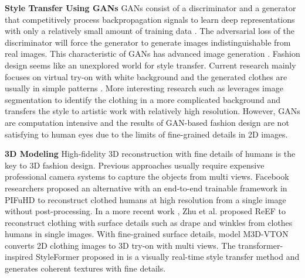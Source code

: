 \documentclass{article}
\begin{document}
\textbf{Style Transfer Using GANs} GANs consist of a discriminator and a generator that competitively process backpropagation signals to learn deep representations with only a relatively small amount of training data \cite{creswell2018GANoverview, goodfellow2014GAN}. The adversarial loss of the discriminator will force the generator to generate images indistinguishable from real images. This characteristic of GANs has advanced image generation \cite{denton2015deepGAN, radford2015unsupervisedGAN}. Fashion design seems like an unexplored world for style transfer. Current research mainly focuses on virtual try-on with white background and the generated clothes are usually in simple patterns \cite{liu2021fashionVisTool, kato2019ganClothing, yildirim2019customOutfits}. More interesting research such as \cite{wang2020fashionSegmentation} leverages image segmentation to identify the clothing in a more complicated background and transfers the style to artistic work with relatively high resolution. However, GANs are computation intensive and the results of GAN-based fashion design are not satisfying to human eyes due to the limits of fine-grained details in 2D images.

\textbf{3D Modeling} High-fidelity 3D reconstruction with fine details of humans is the key to 3D fashion design. Previous approaches usually require expensive professional camera systems to capture the objects from multi views. Facebook researchers proposed an alternative with an end-to-end trainable framework in PIFuHD \cite{saito2020PIFuHD} to reconstruct clothed humans at high resolution from a single image without post-processing. In a more recent work \cite{zhureef}, Zhu et al. proposed ReEF to reconstruct clothing with surface details such as drape and winkles from clothes humans in single images. With fine-grained surface details, model M3D-VTON \cite{m3dvton} converts 2D clothing images to 3D try-on with multi views. The transformer-inspired StyleFormer proposed in \cite{wu2021styleformer} is a visually real-time style transfer method and generates coherent textures with fine details. 


\end{document}
